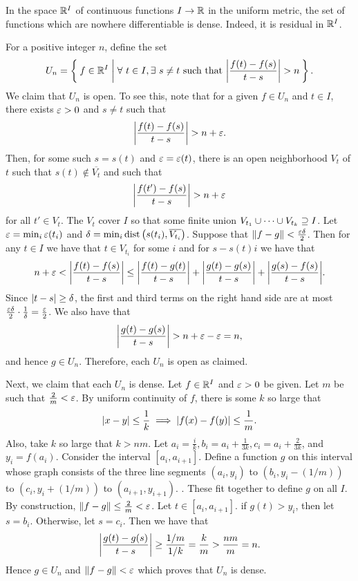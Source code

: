 \documentclass[letterpaper, 11pt, oneside]{book}
\begin{document}
\begin{cor}
  In the space $\mathbb{R}^{I}$ of continuous functions $I \to \mathbb{R}$ in the uniform metric, the set of functions which are nowhere differentiable is dense.
  Indeed, it is residual in $\mathbb{R}^{I}$.
\end{cor}
\begin{pf}
  For a positive integer $n$, define the set
  \[
    U_{n} = \Set{f \in \mathbb{R}^{I} | \forall~t \in I, \exists~ s \neq t \text{ such that } \abs{\frac{f(t) - f(s)}{t - s}} > n}.
  \]
  We claim that $U_{n}$ is open.
  To see this, note that for a given $f \in U_{n}$ and $t \in I$, there exists $\varepsilon > 0$ and $s \neq t$ such that
  \[
    \abs{\frac{f(t) - f(s)}{t - s}} > n + \varepsilon.
  \]
  Then, for some such $s = s(t)$ and $\varepsilon = \varepsilon(t)$, there is an open neighborhood $V_{t}$ of $t$ such that $s(t) \notin \overline{V_{t}}$ and such that
  \[
    \abs{\frac{f(t') - f(s)}{t - s}} > n + \varepsilon
  \]
  for all $t' \in V_{t}$.
  The $V_{t}$ cover $I$ so that some finite union $V_{t_{1}} \cup \cdots \cup V_{t_{k}} \supseteq I$.
  Let $\varepsilon = \min_{i} \varepsilon(t_{i})$ and $\delta =  \min_{i} \dist\pqty{s(t_{i}), \overline{V_{t_{i}}}}$.
  Suppose that $\norm{f - g} < \frac{\varepsilon\delta}{2}$.
  Then for any $t \in I$ we have that $t \in V_{t_{i}}$ for some $i$ and for $s - s(t)i$ we have that
  \[
    n + \varepsilon < \abs{\frac{f(t) - f(s)}{t - s}} \leq \abs{\frac{f(t) - g(t)}{t - s}} + \abs{\frac{g(t) - g(s)}{t - s}} + \abs{\frac{g(s) - f(s)}{t - s}}.
  \]
  Since $\abs{t - s} \geq \delta$, the first and third terms on the right hand side are at most $\frac{\varepsilon \delta}{2} \cdot \frac{1}{\delta} = \frac{\varepsilon}{2}$.
  We also have that
  \[
    \abs{\frac{g(t) - g(s)}{t - s}} > n + \varepsilon - \varepsilon = n,
  \]
  and hence $g \in U_{n}$.
  Therefore, each $U_{n}$ is open as claimed.

  Next, we claim that each $U_{n}$ is dense.
  Let $f \in \mathbb{R}^{I}$ and $\varepsilon > 0$ be given.
  Let $m$ be such that $\frac{2}{m} < \varepsilon$.
  By uniform continuity of $f$, there is some $k$ so large that
  \[
    \abs{x - y} \leq \frac{1}{k} \implies \abs{f(x) - f(y)} \leq \frac{1}{m}.
  \]
  Also, take $k$ so large that $k > nm$.
  Let $a_{i} = \frac{i}{k}, b_{i} = a_{i} + \frac{1}{3k}, c_{i} = a_{i} + \frac{2}{3k}$, and $y_{i} = f(a_{i})$.
  Consider the interval $[a_{i}, a_{i + 1}]$.
  Define a function $g$ on this interval whose graph consists of the three line segments $(a_{i}, y_{i})$ to $(b_{i}, y_{i} - (1 / m))$ to $(c_{i}, y_{i} + (1 / m))$ to $(a_{i + 1}, y_{i + 1})$.
  .
  These fit together to define $g$ on all $I$.
  By construction, $\norm{f - g} \leq \frac{2}{m} < \varepsilon$.
  Let $t \in [a_{i}, a_{i + 1}]$.
  if $g(t) > y_{i}$, then let $s = b_{i}$.
  Otherwise, let $s = c_{i}$.
  Then we have that
  \[
    \abs{\frac{g(t) - g(s)}{t - s}} \geq \frac{1 / m}{1 / k} = \frac{k}{m} > \frac{nm}{m} = n.
  \]
  Hence $g \in U_{n}$ and $\norm{f - g} < \varepsilon$ which proves that $U_{n}$ is dense.


\end{pf}
\end{document}
